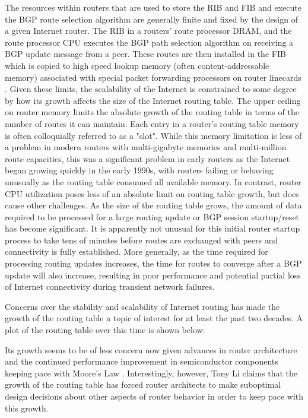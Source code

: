 The resources within routers that are used to store the RIB and FIB and execute the BGP route selection algorithm are generally finite and fixed by the design of a given Internet router. The RIB in a routers' route processor DRAM, and the route processor CPU executes the BGP path selection algorithm on receiving a BGP update message from a peer. These routes are then installed in the FIB which is copied to high speed lookup memory (often content-addressable memory) associated with special packet forwarding processors on router linecards \cite{Zhao:2010fu}. Given these limits, the scalability of the Internet is constrained to some degree by how its growth affects the size of the Internet routing table. The upper ceiling on router memory limits the absolute growth of the routing table in terms of the number of routes it can maintain. Each entry in a router's routing table memory is often colloquially referred to as a "slot". While this memory limitation is less of a problem in modern routers with multi-gigabyte memories and multi-million route capacities, this was a significant problem in early routers as the Internet began growing quickly in the early 1990s, with routers failing or behaving unusually as the routing table consumed all available memory. In contrast, router CPU utilization poses less of an absolute limit on routing table growth, but does cause other challenges. As the size of the routing table grows, the amount of data required to be processed for a large routing update or BGP session startup/reset has become significant. It is apparently not unusual for this initial router startup process to take tens of minutes \cite{Steenbergen:2010nx} before routes are exchanged with peers and connectivity is fully established. More generally, as the time required for processing routing updates increases, the time for routes to converge after a BGP update will also increase, resulting in poor performance and potential partial loss of Internet connectivity during transient network failures.

Concerns over the stability and scalability of Internet routing has made the growth of the routing table a topic of interest for at least the past two decades. A plot of the routing table over this time is shown below:


Its growth seems to be of less concern now given advances in router architecture and the continued performance improvement in semiconductor components keeping pace with Moore's Law \cite{McKeown:2006kx}. Interestingly, however, Tony Li claims that the growth of the routing table has forced router architects to make suboptimal design decisions about other aspects of router behavior in order to keep pace with this growth.

